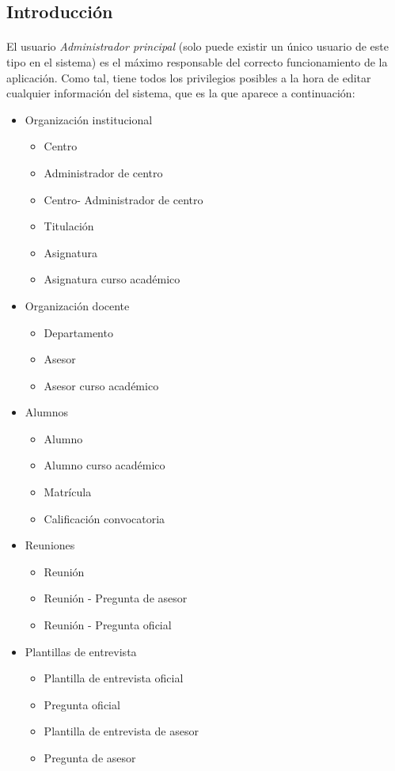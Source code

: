 \subsection{Introducción}

  \paragraph{}El usuario \textit{Administrador principal} (solo puede existir un
  único usuario de este tipo en el sistema) es el máximo responsable del
  correcto funcionamiento de la aplicación. Como tal, tiene todos los
  privilegios posibles a la hora de editar cualquier información del sistema,
  que es la que aparece a continuación:

  \begin{itemize}
    \item Organización institucional
    \begin{itemize}
      \item Centro
      \item Administrador de centro
      \item Centro- Administrador de centro
      \item Titulación
      \item Asignatura
      \item Asignatura curso académico
    \end{itemize}
   \item Organización docente
   \begin{itemize}
      \item Departamento
      \item Asesor
      \item Asesor curso académico
   \end{itemize}
   \item Alumnos
   \begin{itemize}
      \item Alumno
      \item Alumno curso académico
      \item Matrícula
      \item Calificación convocatoria
   \end{itemize}
   \item Reuniones
   \begin{itemize}
      \item Reunión
      \item Reunión - Pregunta de asesor
      \item Reunión - Pregunta oficial
   \end{itemize}
   \item Plantillas de entrevista
   \begin{itemize}
      \item Plantilla de entrevista oficial
      \item Pregunta oficial
      \item Plantilla de entrevista de asesor
      \item Pregunta de asesor
   \end{itemize}
  \end{itemize}


